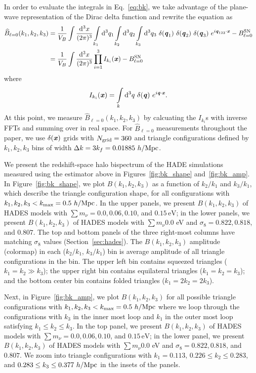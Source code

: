 \documentclass[12pt, letterpaper, preprint]{aastex62}
\newcommand{\smnu}{\sum m_\nu}
\newcommand{\sig}{\sigma_8}
\newcommand{\bfi}[1]{\textbf{\textit{#1}}}
\newcommand{\beq}{\begin{equation}}
\newcommand{\eeq}{\end{equation}}
\begin{document}
In order to evaluate the integrals in Eq.~\ref{eq:bk}, we take advantage of the plane-wave 
representation of the Dirac delta function and rewrite the equation as
\begin{align} \label{eq:bk2} 
    \widehat{B}_{\ell = 0}(k_1,k_2, k_3) &= \frac{1}{V_B} \int\frac{{\rm d}^3x}{(2\pi)^3} \int\limits_{k_1}{\rm d}^3q_1 \int\limits_{k_2}{\rm d}^3q_2 \int\limits_{k_3}{\rm d}^3q_3~\delta({\bfi q_1})~\delta({\bfi q_2})~\delta({\bfi q_3})~e^{i{\bfi q_{123}}\cdot{\bfi x}} - B^{\rm SN}_{\ell = 0}\\ 
    &= \frac{1}{V_B} \int\frac{{\rm d}^3x}{(2\pi)^3}\prod\limits_{i=1}^{3} I_{k_i}({\bfi x}) - B^{\rm SN}_{\ell = 0} 
\end{align}
where 
\beq
I_{k_i}({\bfi x}) = \int\limits_k {\rm d}^3q~\delta({\bfi q})~e^{i {\bfi q}\cdot{\bfi x}}. 
\eeq
At this point, we measure $\widehat{B}_{\ell = 0}(k_1, k_2, k_3)$ by calcuating the 
$I_{k_i}$s with inverse FFTs and summing over in real space. For $\widehat{B}_{\ell = 0}$
measurements throughout the paper, we use $\delta({\bfi x})$ grids with $N_{\rm grid} = 360$ 
and triangle configurations defined by $k_1, k_2, k_3$ bins of width 
$\Delta k = 3 k_f = 0.01885~h/{\rm Mpc}$.

We present the redshift-space halo bispectrum of the HADE simulations measured using 
the estimator above in Figures~\ref{fig:bk_shape} and~\ref{fig:bk_amp}. In Figure~\ref{fig:bk_shape}, 
we plot $B(k_1, k_2, k_3)$ as a function of $k_2/k_1$ and $k_3/k_1$, which describe the
triangle configuration shape, for all configurations with $k_1, k_2, k_3 < k_{\rm max} = 0.5~h/{\rm Mpc}$. 
In the upper panels, we present $B(k_1, k_2, k_3)$ of HADES models with 
$\smnu = 0.0, 0.06, 0.10$, and $0.15\,\mathrm{eV}$; in the lower panels, we present
$B(k_1, k_2, k_3)$ of HADES models with $\smnu 0.0$ eV and $\sig = 0.822, 0.818$, and 
$0.807$. The top and bottom panels of the three right-most columns have matching $\sig$
values (Section~\ref{sec:hades}). The $B(k_1, k_2, k_3)$ amplitude (colormap) in each 
($k_2/k_1$, $k_3/k_1$) bin is average amplitude of all triangle configurations in the bin. 
The upper left bin contains squeezed triangles ($k_1 = k_2 \gg k_3$); the upper right bin 
contains equilateral triangles ($k_1 = k_2 = k_3$); and the bottom center bin contains 
folded triangles ($k_1 = 2 k_2 = 2 k_3$). 

Next, in Figure~\ref{fig:bk_amp}, we plot $B(k_1, k_2, k_3)$ for all possible triangle 
configurations with $k_1, k_2, k_3 < k_{\rm max} = 0.5~h/{\rm Mpc}$ where we loop through 
the configurations with $k_3$ in the inner most loop and $k_1$ in the outer most loop 
satisfying $k_1 \leq k_2 \leq k_3$. In the top panel, we present $B(k_1, k_2, k_3)$ of 
HADES models with $\smnu = 0.0, 0.06, 0.10$, and $0.15\,\mathrm{eV}$; in the lower panel, 
we present $B(k_1, k_2, k_3)$ of HADES models with $\smnu 0.0$ eV and $\sig = 0.822, 0.818$, 
and $0.807$. We zoom into triangle configurations with $k_1 = 0.113$, $0.226 \leq k_2 \leq 0.283$, 
and $0.283 \leq k_3 \leq 0.377~h/{\rm Mpc}$ in the insets of the panels. 
\end{document}
